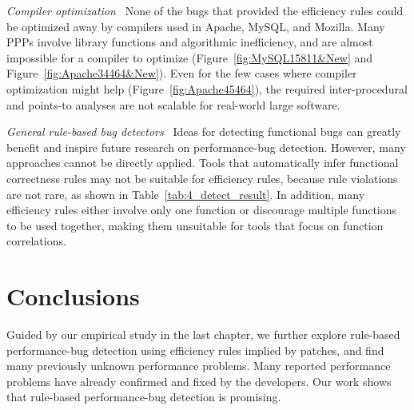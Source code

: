 {\it Compiler optimization\ }
None of the bugs that provided the efficiency rules could be optimized
away by compilers used in Apache, MySQL, and Mozilla. Many PPPs 
involve library functions and algorithmic inefficiency, and
are almost impossible for a compiler to optimize
(Figure~\ref{fig:MySQL15811&New} and Figure~\ref{fig:Apache34464&New}).
Even for the few cases where compiler optimization might help
(Figure~\ref{fig:Apache45464}), 
the required inter-procedural and points-to analyses are not scalable
for real-world large software. 

{\it General rule-based bug detectors\ }
Ideas for detecting functional bugs can greatly benefit 
and inspire future research on performance-bug detection.
However, many approaches cannot be directly applied.
Tools that automatically infer functional correctness rules 
\citep{engler01bugs,PRMiner05,livshits05dynamine} may not be suitable
for efficiency rules, because rule violations are not rare,
as shown in Table~\ref{tab:4_detect_result}. In addition, many efficiency rules either
involve only one function or discourage multiple functions to be used together, 
making them unsuitable for tools that focus on function correlations. 

\section{Conclusions}

Guided by our empirical study in the last chapter, 
we further explore rule-based performance-bug detection using efficiency rules implied by patches, 
and find many previously unknown performance problems. 
Many reported performance problems have already confirmed and fixed by the developers. 
Our work shows that rule-based performance-bug detection is promising. 




